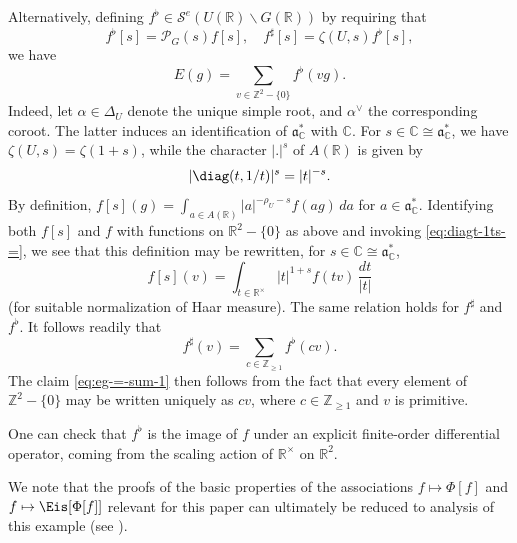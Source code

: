 \begin{example}
  Alternatively, defining $f^{\flat} \in \mathcal{S}^e(U(\mathbb{R}) \backslash G(\mathbb{R}))$ by requiring that
  \begin{equation*}
    f^{\flat}[s] = \mathcal{P}_G(s) f[s],
    \quad
    f^\sharp [s] = \zeta(U,s) f^{\flat}[s],
  \end{equation*}
  we have
  \begin{equation}\label{eq:eg-=-sum-1}
    E(g) = \sum_{v \in \mathbb{Z}^2 - \{0\}} f^{\flat}(v g).
  \end{equation}
  Indeed, let $\alpha \in \Delta_U$ denote the unique simple root, and $\alpha^\vee$ the corresponding coroot.  The latter induces an identification of $\mathfrak{a}_{\mathbb{C}}^*$ with $\mathbb{C}$.  For $s \in \mathbb{C} \cong \mathfrak{a}_{\mathbb{C}}^*$, we have $\zeta(U,s) = \zeta(1 + s)$, while the character $|.|^s$ of $A(\mathbb{R})$ is given by
  \begin{equation}\label{eq:diagt-1ts-=}
    |\diag(t, 1/t)|^s = |t|^{-s}.
  \end{equation}
  By definition, $f[s](g) = \int_{a \in A(\mathbb{R})} |a|^{-\rho_U - s} f(a g) \, d a$ for $a \in \mathfrak{a}_{\mathbb{C}}^*$.  Identifying both $f[s]$ and $f$ with functions on $\mathbb{R}^2 - \{0\}$ as above and invoking \eqref{eq:diagt-1ts-=}, we see that this definition may be rewritten, for $s \in \mathbb{C} \cong \mathfrak{a}_{\mathbb{C}}^*$,
  \begin{equation*}
    f[s](v) = \int_{t \in \mathbb{R}^\times } |t|^{1+s} f(t v) \, \frac{d t}{|t|}
  \end{equation*}
  (for suitable normalization of Haar measure).  The same relation holds for $f^\sharp$ and $f^{\flat}$.  It follows readily that
  \begin{equation*}
    f^\sharp (v) = \sum_{c \in \mathbb{Z}_{\geq 1} } f^{\flat} (c v).
  \end{equation*}
  The claim \eqref{eq:eg-=-sum-1} then follows from the fact that every element of $\mathbb{Z} ^2 - \{0\}$ may be written uniquely as $c v$, where $c \in \mathbb{Z}_{\geq 1}$ and $v$ is primitive.

  One can check that $f^\flat$ is the image of $f$ under an explicit finite-order differential operator, coming from the scaling action of $\mathbb{R}^\times$ on $\mathbb{R}^2$.

  We note that the proofs of the basic properties of the associations $f \mapsto \Phi[f]$ and $f \mapsto \Eis[\Phi[f]]$ relevant for this paper can ultimately be reduced to analysis of this example (see \cite[\S3.5]{MR3468638}).
\end{example}



